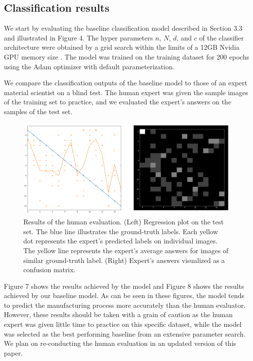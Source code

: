 \documentclass[10pt,twocolumn,letterpaper]{article}
\begin{document}
\subsection{Classification results}
% 
We start by evaluating the baseline classification model described in Section 3.3 and illustrated in Figure 4.
The hyper parameters $n$, $N$, $d$, and $c$ of the classifier architecture 
were obtained by a grid search within the limits of a 12GB Nvidia GPU memory size .
The model was trained on the training dataset for 200 epochs using the Adam optimizer with default parameterization.

We compare the classification outputs of the baseline model to those 
of an expert material scientist on a blind test.
The human expert was given the sample images of the training set to practice,
and we evaluated the expert's answers on the samples of the test set.

\begin{figure}[h]
\centering
\includegraphics[width=0.9\linewidth]{"./figures/Figure7"}
\caption{
Results of the human evaluation. 
(Left) Regression plot on the test set. 
The blue line illustrates the ground-truth labels.
Each yellow dot represents the expert's predicted labels on individual images. 
The yellow line represents the expert's average answers for images of similar ground-truth label.
(Right) Expert's answers visualized as a confusion matrix.
}
\end{figure}

Figure 7 shows the results achieved by the model and Figure 8 shows the results achieved by our baseline model.
As can be seen in these figures, the model tends to predict the manufacturing 
process more accurately than the human evaluator.
However, these results should be taken with a grain of caution 
as the human expert was given little time to practice on this specific dataset,
while the model was selected as the best performing baseline from an extensive parameter search.
We plan on re-conducting the human evaluation in an updated version of this paper.
\end{document}
